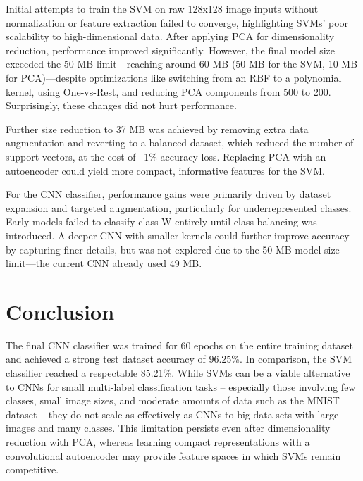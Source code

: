 \documentclass[a4, 10 pt, conference]{ieeeconf}  %
\begin{document}
Initial attempts to train the SVM on raw 128x128 image inputs without normalization or feature extraction failed to converge, highlighting SVMs' poor scalability to high-dimensional data. After applying PCA for dimensionality reduction, performance improved significantly. However, the final model size exceeded the 50 MB limit—reaching around 60 MB (50 MB for the SVM, 10 MB for PCA)—despite optimizations like switching from an RBF to a polynomial kernel, using One-vs-Rest, and reducing PCA components from 500 to 200. Surprisingly, these changes did not hurt performance.

Further size reduction to 37 MB was achieved by removing extra data augmentation and reverting to a balanced dataset, which reduced the number of support vectors, at the cost of ~1\% accuracy loss. Replacing PCA with an autoencoder could yield more compact, informative features for the SVM.

For the CNN classifier, performance gains were primarily driven by dataset expansion and targeted augmentation, particularly for underrepresented classes. Early models failed to classify class W entirely until class balancing was introduced. A deeper CNN with smaller kernels could further improve accuracy by capturing finer details, but was not explored due to the 50 MB model size limit—the current CNN already used 49 MB.


\section{Conclusion}
\label{sec:con}

The final CNN classifier was trained for 60 epochs on the entire training
dataset and achieved a strong test dataset accuracy of 96.25\%. In comparison,
the SVM classifier reached a respectable 85.21\%. While SVMs can be a viable
alternative to CNNs for small multi-label classification tasks -- especially
those involving few classes, small image sizes, and moderate amounts of
data such as the MNIST dataset -- they do not scale as effectively as CNNs
to big data sets with large images and many classes. This limitation persists even after
dimensionality reduction with PCA, whereas learning compact representations
with a convolutional autoencoder may provide feature spaces in which SVMs remain competitive.


\end{document}
